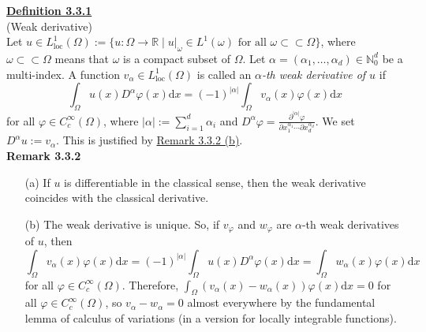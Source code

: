 \textbf{\underline{Definition 3.3.1}}\\
(Weak derivative)\\
Let $u\in L_\text{loc}^1(\Omega):=\{u:\Omega\longrightarrow\mathbb{R}\mid u|_\omega\in L^1(\omega)\text{ for all }\omega\subset\mathrel\subset\Omega\}$, where $\omega\subset\mathrel\subset\Omega$ means that $\omega$ is a compact subset of $\Omega$. Let $\alpha=(\alpha_1,\dotsc,\alpha_d)\in\mathbb{N}_0^d$ be a multi-index. A function $v_\alpha\in L_\text{loc}^1(\Omega)$ is called an \textit{$\alpha$-th weak derivative of $u$} if
\[\int_\Omega{u(x)D^\alpha\varphi(x)\mathrm{d}x}=(-1)^{\lvert\alpha\rvert}\int_\Omega{v_\alpha(x)\varphi(x)\mathrm{d}x}\]
for all $\varphi\in C_c^\infty(\Omega)$, where $\lvert\alpha\rvert:=\sum_{i=1}^d{\alpha_i}$ and $D^\alpha\varphi=\frac{\partial^{\lvert\alpha\rvert}\varphi}{\partial x_1^{\alpha_1}\cdots\partial x_d^{\alpha_d}}$. We set $D^\alpha u:=v_\alpha$. This is justified by \hyperlink{remark_3_3_2}{Remark 3.3.2 (b)}.\\[11pt]

\hypertarget{remark_3_3_2}{\textbf{Remark 3.3.2}}
\begin{itemize}
	\item[(a)] If $u$ is differentiable in the classical sense, then the weak derivative coincides with the classical derivative.
	\item[(b)] The weak derivative is unique. So, if $v_\varphi$ and $w_\varphi$ are $\alpha$-th weak derivatives of $u$, then
	\[\int_\Omega{v_\alpha(x)\varphi(x)\mathrm{d}x}=(-1)^{\lvert\alpha\rvert}\int_\Omega{u(x)D^\alpha\varphi(x)\mathrm{d}x}=\int_\Omega{w_\alpha(x)\varphi(x)\mathrm{d}x}\]
	for all $\varphi\in C_c^\infty(\Omega)$. Therefore, $\int_\Omega{(v_\alpha(x)-w_\alpha(x))\varphi(x)\mathrm{d}x}=0$ for all $\varphi\in C_c^\infty(\Omega)$, so $v_\alpha-w_\alpha=0$ almost everywhere by the fundamental lemma of calculus of variations (in a version for locally integrable functions).\\[11pt]
\end{itemize}

